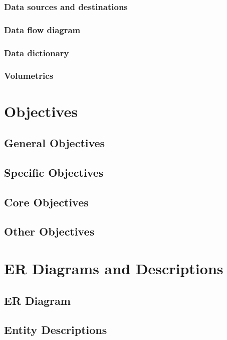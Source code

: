 \subsubsection{Data sources and destinations}

\subsubsection{Data flow diagram}

\subsubsection{Data dictionary}

\subsubsection{Volumetrics}

\section{Objectives}

\subsection{General Objectives}

\subsection{Specific Objectives}

\subsection{Core Objectives}

\subsection{Other Objectives}

\section{ER Diagrams and Descriptions}

\subsection{ER Diagram}

\subsection{Entity Descriptions}

